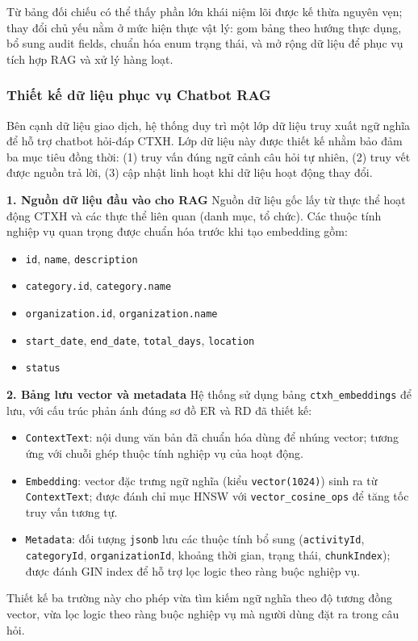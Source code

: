 Từ bảng đối chiếu có thể thấy phần lớn khái niệm lõi được kế thừa nguyên vẹn; thay đổi chủ yếu nằm ở mức hiện thực vật lý: gom bảng theo hướng thực dụng, bổ sung audit fields, chuẩn hóa enum trạng thái, và mở rộng dữ liệu để phục vụ tích hợp RAG và xử lý hàng loạt.

\subsubsection{Thiết kế dữ liệu phục vụ Chatbot RAG}
Bên cạnh dữ liệu giao dịch, hệ thống duy trì một lớp dữ liệu truy xuất ngữ nghĩa để hỗ trợ chatbot hỏi-đáp CTXH. Lớp dữ liệu này được thiết kế nhằm bảo đảm ba mục tiêu đồng thời: (1) truy vấn đúng ngữ cảnh câu hỏi tự nhiên, (2) truy vết được nguồn trả lời, (3) cập nhật linh hoạt khi dữ liệu hoạt động thay đổi.

\textbf{1. Nguồn dữ liệu đầu vào cho RAG}
Nguồn dữ liệu gốc lấy từ thực thể hoạt động CTXH và các thực thể liên quan (danh mục, tổ chức). Các thuộc tính nghiệp vụ quan trọng được chuẩn hóa trước khi tạo embedding gồm:
\begin{itemize}
	\item \texttt{id}, \texttt{name}, \texttt{description}
	\item \texttt{category.id}, \texttt{category.name}
	\item \texttt{organization.id}, \texttt{organization.name}
	\item \texttt{start\_date}, \texttt{end\_date}, \texttt{total\_days}, \texttt{location}
	\item \texttt{status}
\end{itemize}

\textbf{2. Bảng lưu vector và metadata}
Hệ thống sử dụng bảng \texttt{ctxh\_embeddings} để lưu, với cấu trúc phản ánh đúng sơ đồ ER và RD đã thiết kế:
\begin{itemize}
	\item \texttt{ContextText}: nội dung văn bản đã chuẩn hóa dùng để nhúng vector; tương ứng với chuỗi ghép thuộc tính nghiệp vụ của hoạt động.
	\item \texttt{Embedding}: vector đặc trưng ngữ nghĩa (kiểu \texttt{vector(1024)}) sinh ra từ \texttt{ContextText}; được đánh chỉ mục HNSW với \texttt{vector\_cosine\_ops} để tăng tốc truy vấn tương tự.
	\item \texttt{Metadata}: đối tượng \texttt{jsonb} lưu các thuộc tính bổ sung (\texttt{activityId}, \texttt{categoryId}, \texttt{organizationId}, khoảng thời gian, trạng thái, \texttt{chunkIndex}); được đánh GIN index để hỗ trợ lọc logic theo ràng buộc nghiệp vụ.
\end{itemize}
Thiết kế ba trường này cho phép vừa tìm kiếm ngữ nghĩa theo độ tương đồng vector, vừa lọc logic theo ràng buộc nghiệp vụ mà người dùng đặt ra trong câu hỏi.

